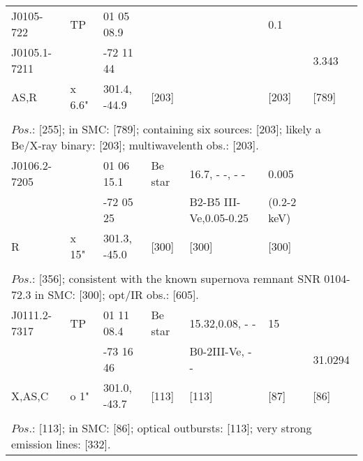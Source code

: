 \documentclass{aa}
\begin{document}
\begin{table*}[h]
\begin{tabular}{p{2.5cm}p{1cm}p{1.8cm}p{2.3cm}p{3.3cm}p{2.0cm}p{2.2cm}}
\noalign{\smallskip}
\hline
\noalign{\smallskip}
J0105-722          &   TP        &   01 05 08.9          &                   &                 & 0.1                   &           \\                      
J0105.1-7211    &                 &    -72 11 44          &                    &                 &                         &  3.343  \\
AS,R                   &  x 6.6"     &  301.4, -44.9        &      [203]    &                 &  [203]              &    [789]  \\
  
 \\
\multicolumn{7}{p{17.5cm}}{
$Pos$.: [255]; in SMC: [789]; containing six sources: [203]; likely a Be/X-ray binary: [203]; multiwavelenth obs.: [203].  }\\

\noalign{\smallskip}
\hline
\noalign{\smallskip}
J0106.2-7205 &                &  01 06 15.1    &  Be star          & 16.7, - -, - -                            & 0.005                     &      \\          
                          &                &   -72 05 25     &                          &  B2-B5 III-Ve,0.05-0.25     &  (0.2-2 keV)            &    \\
R                       &   x 15"    & 301.3, -45.0   &          [300]         &   [300]                                  &  [300]                         &    \\
  
\\
\multicolumn{7}{p{17.5cm}}{
$Pos$.: [356]; consistent with the known supernova remnant SNR 0104-72.3 in SMC: [300]; opt/IR obs.: [605].  }\\

\noalign{\smallskip}
\hline
\noalign{\smallskip}
J0111.2-7317        &    TP   & 01 11 08.4              &  Be star         & 15.32,0.08, - -    &   15                &             \\               
                                 &            &      -73 16 46           &                          &  B0-2III-Ve, - -   &                         &    31.0294   \\
X,AS,C                    & o 1"   & 301.0, -43.7            &       [113]          &    [113]                &     [87]          &      [86]  \\
  
 \\
\multicolumn{7}{p{17.5cm}}{
$Pos$.: [113]; in SMC: [86]; optical outbursts: [113]; very strong emission lines: [332].  }\\


\end{tabular}
\end{table*}
\end{document}

